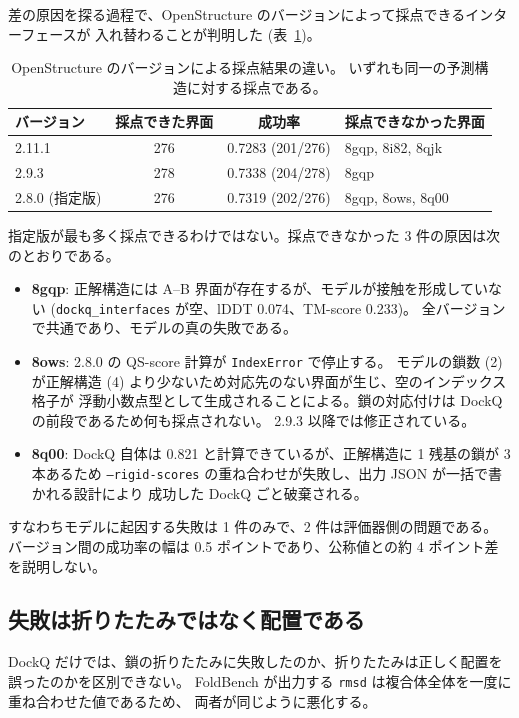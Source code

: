 \documentclass[11pt,a4paper]{article}
\begin{document}
差の原因を探る過程で、OpenStructure のバージョンによって採点できるインターフェースが
入れ替わることが判明した (表~\ref{tab:ostver})。

\begin{table}[htbp]
\centering
\caption{OpenStructure のバージョンによる採点結果の違い。
いずれも同一の予測構造に対する採点である。}
\label{tab:ostver}
\begin{tabular}{lccl}
\toprule
バージョン & 採点できた界面 & 成功率 & 採点できなかった界面 \\
\midrule
2.11.1 & 276 & 0.7283 (201/276) & 8gqp, 8i82, 8qjk \\
2.9.3 & 278 & 0.7338 (204/278) & 8gqp \\
2.8.0 (指定版) & 276 & 0.7319 (202/276) & 8gqp, 8ows, 8q00 \\
\bottomrule
\end{tabular}
\end{table}

指定版が最も多く採点できるわけではない。採点できなかった 3 件の原因は次のとおりである。

\begin{itemize}
\item \textbf{8gqp}: 正解構造には A--B 界面が存在するが、モデルが接触を形成していない
(\texttt{dockq\_interfaces} が空、lDDT 0.074、TM-score 0.233)。
全バージョンで共通であり、モデルの真の失敗である。
\item \textbf{8ows}: 2.8.0 の QS-score 計算が \texttt{IndexError} で停止する。
モデルの鎖数 (2) が正解構造 (4) より少ないため対応先のない界面が生じ、空のインデックス格子が
浮動小数点型として生成されることによる。鎖の対応付けは DockQ の前段であるため何も採点されない。
2.9.3 以降では修正されている。
\item \textbf{8q00}: DockQ 自体は 0.821 と計算できているが、正解構造に 1 残基の鎖が 3 本あるため
\texttt{--rigid-scores} の重ね合わせが失敗し、出力 JSON が一括で書かれる設計により
成功した DockQ ごと破棄される。
\end{itemize}

すなわちモデルに起因する失敗は 1 件のみで、2 件は評価器側の問題である。
バージョン間の成功率の幅は 0.5 ポイントであり、公称値との約 4 ポイント差を説明しない。

\subsection{失敗は折りたたみではなく配置である}

DockQ だけでは、鎖の折りたたみに失敗したのか、折りたたみは正しく配置を誤ったのかを区別できない。
FoldBench が出力する \texttt{rmsd} は複合体全体を一度に重ね合わせた値であるため、
両者が同じように悪化する。
\end{document}
